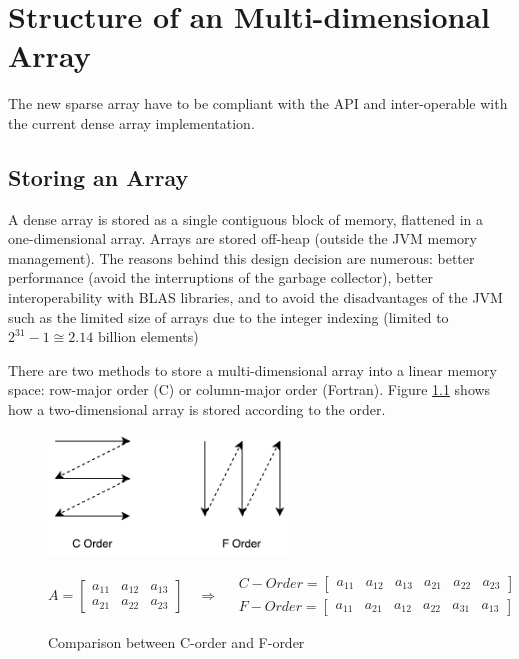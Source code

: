 \chapter{Structure of an Multi-dimensional Array}
The new sparse array have to be compliant with the API and inter-operable with the current dense array implementation.



\section{Storing an Array}
\label{sec:storing}

A dense array is stored as a single contiguous block of memory, flattened in a one-dimensional array. Arrays are stored off-heap (outside the JVM memory management). The reasons behind this design decision are numerous: better performance (avoid the interruptions of the garbage collector), better interoperability with BLAS libraries, and to avoid the disadvantages of the {JVM} such as the limited size of arrays due to the integer indexing (limited to $2^{31}-1 \cong 2.14 \text{ billion}$ elements)

There are two methods to store a multi-dimensional array into a linear memory space: row-major order (C) or column-major order (Fortran). Figure \ref{fig:orders} shows how a two-dimensional array is stored according to the order.

\begin{figure}[h]
	\begin{center}
		\includegraphics[width=2.5in]{images/c_f_Orders.pdf} 
		\label{fig:cOrders}
	\end{center}
	\[
	A = 
	\begin{bmatrix}
	a_{11} &  a_{12} & a_{13} \\
	a_{21} &  a_{22} & a_{23}
	\end{bmatrix}
	\quad\Rightarrow\quad
	\begin{aligned}
	C-Order = 
	\begin{bmatrix}
	a_{11} &  a_{12} & a_{13} & a_{21} &  a_{22} & a_{23}
	\end{bmatrix}
	\\
	F-Order = 
	\begin{bmatrix}
	a_{11} &  a_{21} & a_{12} & a_{22} &  a_{31} & a_{13}
	\end{bmatrix}
	\end{aligned}
	\]
\caption{Comparison between C-order and F-order}
\label{fig:orders}

\end{figure}

